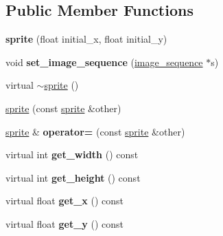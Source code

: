 \subsection*{Public Member Functions}
\begin{DoxyCompactItemize}
\item 
\hypertarget{classcsis3700_1_1sprite_a5395ad1b481e56895f11d57c7a052353}{{\bfseries sprite} (float initial\-\_\-x, float initial\-\_\-y)}\label{classcsis3700_1_1sprite_a5395ad1b481e56895f11d57c7a052353}

\item 
\hypertarget{classcsis3700_1_1sprite_a0b6e3ec9733f1300aac47ecf8570ee0b}{void {\bfseries set\-\_\-image\-\_\-sequence} (\hyperlink{classcsis3700_1_1image__sequence}{image\-\_\-sequence} $\ast$s)}\label{classcsis3700_1_1sprite_a0b6e3ec9733f1300aac47ecf8570ee0b}

\item 
virtual \hyperlink{classcsis3700_1_1sprite_a8f6db48ecf33279af2d084a344baae8c}{$\sim$sprite} ()
\item 
\hyperlink{classcsis3700_1_1sprite_adff79f206ea0703727a72287242fd8b1}{sprite} (const \hyperlink{classcsis3700_1_1sprite}{sprite} \&other)
\item 
\hypertarget{classcsis3700_1_1sprite_abd31e459d917f4789dd203730144e19a}{\hyperlink{classcsis3700_1_1sprite}{sprite} \& {\bfseries operator=} (const \hyperlink{classcsis3700_1_1sprite}{sprite} \&other)}\label{classcsis3700_1_1sprite_abd31e459d917f4789dd203730144e19a}

\item 
\hypertarget{classcsis3700_1_1sprite_a3ce0e3e67fc21797193f799b3c529630}{virtual int {\bfseries get\-\_\-width} () const }\label{classcsis3700_1_1sprite_a3ce0e3e67fc21797193f799b3c529630}

\item 
\hypertarget{classcsis3700_1_1sprite_a9f8719b41f7edeee77a56b548a339001}{virtual int {\bfseries get\-\_\-height} () const }\label{classcsis3700_1_1sprite_a9f8719b41f7edeee77a56b548a339001}

\item 
\hypertarget{classcsis3700_1_1sprite_af46c020f2e3c6e53c4d31300e7e3c9dc}{virtual float {\bfseries get\-\_\-x} () const }\label{classcsis3700_1_1sprite_af46c020f2e3c6e53c4d31300e7e3c9dc}

\item 
\hypertarget{classcsis3700_1_1sprite_aa546c86a477ef21fda91618d9e751bd8}{virtual float {\bfseries get\-\_\-y} () const }\label{classcsis3700_1_1sprite_aa546c86a477ef21fda91618d9e751bd8}


\end{DoxyCompactItemize}

